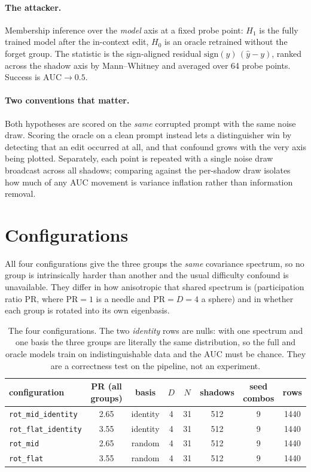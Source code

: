 \documentclass[11pt,a4paper]{article}
\begin{document}
\paragraph{The attacker.} Membership inference over the \emph{model} axis at a
fixed probe point: $H_1$ is the fully trained model after the in-context edit,
$H_0$ is an oracle retrained without the forget group. The statistic is the
sign-aligned residual $\mathrm{sign}(y)\,(\hat y - y)$, ranked across the shadow
axis by Mann--Whitney and averaged over 64 probe points. Success is
$\mathrm{AUC}\to 0.5$.

\paragraph{Two conventions that matter.} Both hypotheses are scored on the
\emph{same} corrupted prompt with the same noise draw. Scoring the oracle on a
clean prompt instead lets a distinguisher win by detecting that an edit
occurred at all, and that confound grows with the very axis being plotted.
Separately, each point is repeated with a single noise draw broadcast across all
shadows; comparing against the per-shadow draw isolates how much of any AUC
movement is variance inflation rather than information removal.


\section{Configurations}

All four configurations give the three groups the \emph{same} covariance
spectrum, so no group is intrinsically harder than another and the usual
difficulty confound is unavailable. They differ in how anisotropic that shared
spectrum is (participation ratio $\mathrm{PR}$, where $\mathrm{PR}=1$ is a
needle and $\mathrm{PR}=D=4$ a sphere) and in whether each group is rotated into
its own eigenbasis.


\begin{table}[h]\centering\small
\begin{tabular}{lccccccc}
\toprule
configuration & PR (all groups) & basis & $D$ & $N$ & shadows & seed combos & rows \\
\midrule
\texttt{rot\_mid\_identity} & 2.65 & identity & 4 & 31 & 512 & 9 & 1440 \\
\texttt{rot\_flat\_identity} & 3.55 & identity & 4 & 31 & 512 & 9 & 1440 \\
\texttt{rot\_mid} & 2.65 & random & 4 & 31 & 512 & 9 & 1440 \\
\texttt{rot\_flat} & 3.55 & random & 4 & 31 & 512 & 9 & 1440 \\
\bottomrule
\end{tabular}
\caption{The four configurations. The two \emph{identity} rows are nulls: with
one spectrum and one basis the three groups are literally the same
distribution, so the full and oracle models train on indistinguishable data and
the AUC must be chance. They are a correctness test on the pipeline, not an
experiment.}
\end{table}
\end{document}
